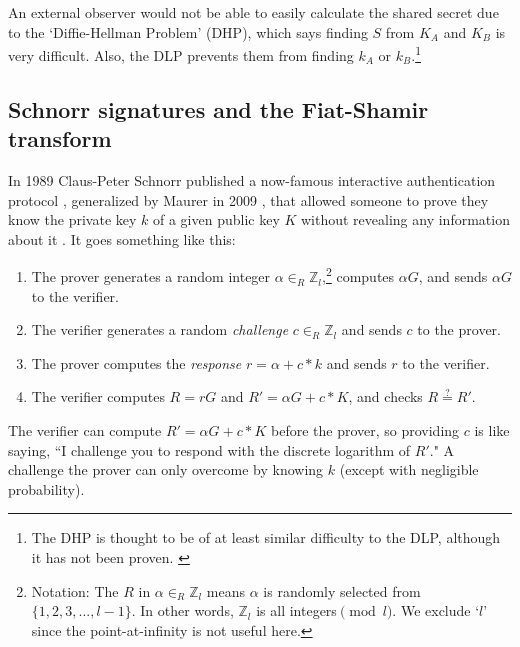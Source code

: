 An external observer would not be able to easily calculate the shared secret due to the `Diffie-Hellman Problem' (DHP), which says finding $S$ from $K_A$ and $K_B$ is very difficult. Also, the DLP prevents them from finding $k_A$ or $k_B$.\footnote{The DHP is thought to be of at least similar difficulty to the DLP, although it has not been proven. \cite{diffie-hellman-problem}}


\subsection{Schnorr signatures and the Fiat-Shamir transform}
\label{sec:schnorr-fiat-shamir}

In 1989 Claus-Peter Schnorr published a now-famous interactive authentication protocol \cite{schnorr-signatures}, generalized by Maurer in 2009 \cite{simple-zk-proof-maurer}, that allowed someone to prove they know the private key $k$ of a given public key $K$ without revealing any information about it \cite{Signatures2015BorromeanRS}. It goes something like this:

\begin{enumerate}
	\item The prover generates a random integer \(\alpha \in_R \mathbb{Z}_l\),\footnote{\label{notation3_note}Notation: The $R$ in \(\alpha \in_R \mathbb{Z}_l\) means $\alpha$ is randomly selected from \(\{1,2,3,...,l-1\}\). In other words, $\mathbb{Z}_l$ is all integers$\pmod l$. We exclude `$l$' since the point-at-infinity is not useful here.} computes $\alpha G$, and sends $\alpha G$ to the verifier.
	\item The verifier generates a random {\em challenge} $c \in_R \mathbb{Z}_l$ and sends $c$ to the prover.
	\item The prover computes the {\em response} $r = \alpha + c*k$ and sends $r$ to the verifier.
	\item The verifier computes $R = r G$ and $R' = \alpha G + c*K$, and checks $R \stackrel{?}{=} R'$.
\end{enumerate}

The verifier can compute $R' = \alpha G + c*K$ before the prover, so providing $c$ is like saying, ``I challenge you to respond with the discrete logarithm of $R'$." A challenge the prover can only overcome by knowing $k$ (except with negligible probability).

